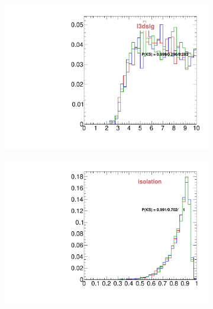 \begin{figure}
\begin{subfigure}[b]{0.2\textwidth}
                \includegraphics[width=\textwidth]{Figures/VariablesComparison/MC_endcaps_figs_3h/l3dsig}
                \label{fig:MC_endcaps_l3dsig_3h}
        \end{subfigure}
        \begin{subfigure}[b]{0.2\textwidth}
                \centering
                \includegraphics[width=\textwidth]{Figures/VariablesComparison/MC_endcaps_figs_3h/isolation}
                \label{fig:MC_endcaps_isolation_3h}
        \end{subfigure}
        \begin{subfigure}[b]{0.2\textwidth}
                \centering

\end{subfigure}
\end{figure}
